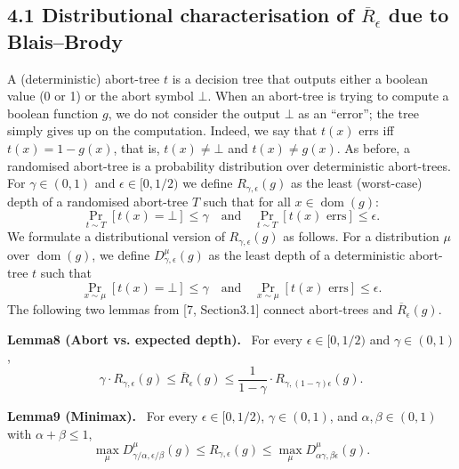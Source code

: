 \documentclass[10pt,a4paper]{article}
\newenvironment{authorclaim}[1]{\par\medskip\noindent\textbf{#1.}\ }{\par\medskip}
\begin{document}
\subsection*{4.1 Distributional characterisation of $\overline R_\epsilon$ due to Blais--Brody}
A (deterministic) abort-tree $t$ is a decision tree that outputs either a boolean value (0 or 1) or the abort symbol $\bot$. When an abort-tree is trying to compute a boolean function $g$, we do not consider the output $\bot$ as an ``error''; the tree simply gives up on the computation. Indeed, we say that $t(x)$ errs iff $t(x)=1-g(x)$, that is, $t(x)\ne\bot$ and $t(x)\ne g(x)$. As before, a randomised abort-tree is a probability distribution over deterministic abort-trees. For $\gamma\in(0,1)$ and $\epsilon\in[0,1/2)$ we define $R_{\gamma,\epsilon}(g)$ as the least (worst-case) depth of a randomised abort-tree $T$ such that for all $x\in\operatorname{dom}(g)$:
\[\Pr_{t\sim T}[t(x)=\bot]\le\gamma\quad\text{and}\quad\Pr_{t\sim T}[t(x)\text{ errs}]\le\epsilon.\]
We formulate a distributional version of $R_{\gamma,\epsilon}(g)$ as follows. For a distribution $\mu$ over $\operatorname{dom}(g)$, we define $D^\mu_{\gamma,\epsilon}(g)$ as the least depth of a deterministic abort-tree $t$ such that
\[\Pr_{x\sim\mu}[t(x)=\bot]\le\gamma\quad\text{and}\quad\Pr_{x\sim\mu}[t(x)\text{ errs}]\le\epsilon.\]
The following two lemmas from [7, Section3.1] connect abort-trees and $\overline R_\epsilon(g)$.
\begin{authorclaim}{Lemma8 (Abort vs. expected depth)}
For every $\epsilon\in[0,1/2)$ and $\gamma\in(0,1)$,
\[\gamma\cdot R_{\gamma,\epsilon}(g)\le\overline R_\epsilon(g)\le\frac1{1-\gamma}\cdot R_{\gamma,(1-\gamma)\epsilon}(g).\]
\end{authorclaim}
\begin{authorclaim}{Lemma9 (Minimax)}
For every $\epsilon\in[0,1/2)$, $\gamma\in(0,1)$, and $\alpha,\beta\in(0,1)$ with $\alpha+\beta\le1$,
\[\max_\mu D^\mu_{\gamma/\alpha,\epsilon/\beta}(g)\le R_{\gamma,\epsilon}(g)\le\max_\mu D^\mu_{\alpha\gamma,\beta\epsilon}(g).\]
\end{authorclaim}
\end{document}
